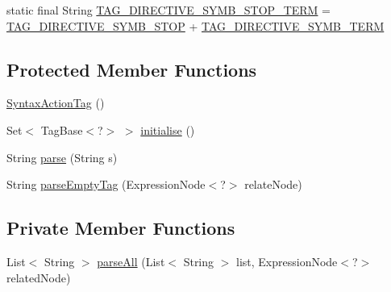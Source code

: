 \begin{DoxyCompactItemize}
\item 
static final String \hyperlink{classit_1_1emarolab_1_1cagg_1_1core_1_1evaluation_1_1semanticGrammar_1_1SyntaxActionTag_a00000bc2a96fb4fd1ae56dc18b242a00}{T\-A\-G\-\_\-\-D\-I\-R\-E\-C\-T\-I\-V\-E\-\_\-\-S\-Y\-M\-B\-\_\-\-S\-T\-O\-P\-\_\-\-T\-E\-R\-M} = \hyperlink{classit_1_1emarolab_1_1cagg_1_1core_1_1evaluation_1_1semanticGrammar_1_1SyntaxActionTag_ab783445ee6233fd88a706769a334261b}{T\-A\-G\-\_\-\-D\-I\-R\-E\-C\-T\-I\-V\-E\-\_\-\-S\-Y\-M\-B\-\_\-\-S\-T\-O\-P} + \hyperlink{classit_1_1emarolab_1_1cagg_1_1core_1_1evaluation_1_1semanticGrammar_1_1SyntaxActionTag_ae3826d8f10b95308988b045fc8bf25d0}{T\-A\-G\-\_\-\-D\-I\-R\-E\-C\-T\-I\-V\-E\-\_\-\-S\-Y\-M\-B\-\_\-\-T\-E\-R\-M}
\end{DoxyCompactItemize}
\subsection*{Protected Member Functions}
\begin{DoxyCompactItemize}
\item 
\hyperlink{classit_1_1emarolab_1_1cagg_1_1core_1_1evaluation_1_1semanticGrammar_1_1SyntaxActionTag_a7ce6b7658fb5a875159f84ab8daeea71}{Syntax\-Action\-Tag} ()
\item 
Set$<$ Tag\-Base$<$?$>$ $>$ \hyperlink{classit_1_1emarolab_1_1cagg_1_1core_1_1evaluation_1_1semanticGrammar_1_1SyntaxActionTag_a4811eef89223f5c0e3fb53019feeac20}{initialise} ()
\item 
String \hyperlink{classit_1_1emarolab_1_1cagg_1_1core_1_1evaluation_1_1semanticGrammar_1_1SyntaxActionTag_a4eeed3489b409b99f1a5d309226d0254}{parse} (String s)
\item 
String \hyperlink{classit_1_1emarolab_1_1cagg_1_1core_1_1evaluation_1_1semanticGrammar_1_1SyntaxActionTag_a429a7d1dc4075bb23bb061259cf5bdaf}{parse\-Empty\-Tag} (Expression\-Node$<$?$>$ relate\-Node)
\end{DoxyCompactItemize}
\subsection*{Private Member Functions}
\begin{DoxyCompactItemize}
\item 
List$<$ String $>$ \hyperlink{classit_1_1emarolab_1_1cagg_1_1core_1_1evaluation_1_1semanticGrammar_1_1SyntaxActionTag_aa9a5a65bb4c5f18d6dd75440042f0a41}{parse\-All} (List$<$ String $>$ list, Expression\-Node$<$?$>$ related\-Node)
\end{DoxyCompactItemize}


